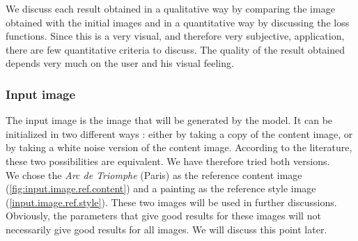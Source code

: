 \documentclass[twocolumn,superscriptaddress,aps, floatfix]{revtex4-1}
\begin{document}
    We discuss each result obtained in a qualitative way by comparing the image obtained with the initial images and in a quantitative way by discussing the loss functions. Since this is a very visual, and therefore very subjective, application, there are few quantitative criteria to discuss. The quality of the result obtained depends very much on the user and his visual feeling.
    
    \subsubsection{Input image}
    
    The input image is the image that will be generated by the model. It can be initialized in two different ways : either by taking a copy of the content image, or by taking a white noise version of the content image. According to the literature, these two possibilities are equivalent. We have therefore tried both versions.\\
    
    We chose the \emph{Arc de Triomphe} (Paris) as the reference content image (\ref{fig:input.image.ref.content}) and a painting as the reference style image (\ref{input.image.ref.style}). These two images will be used in further discussions. Obviously, the parameters that give good results for these images will not necessarily give good results for all images. We will discuss this point later.
    
\end{document}
